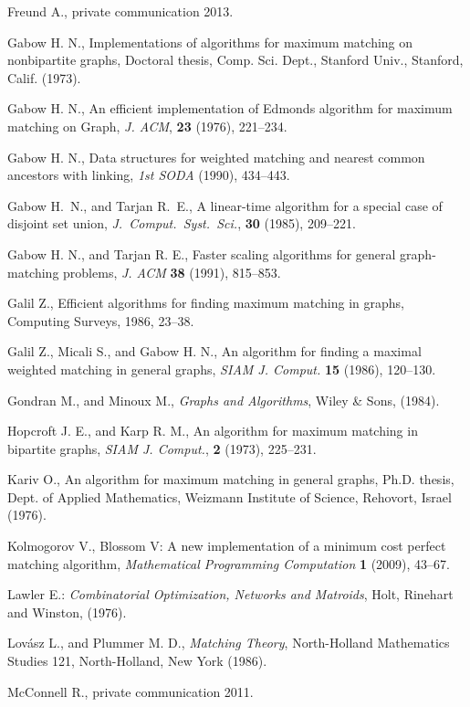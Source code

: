 \documentclass[12pt,twoside,a4paper]{article}
\begin{document}
\begin{thebibliography}{99}
 Freund A., private communication 2013.

 Gabow H. N.,
Implementations of algorithms for maximum matching on nonbipartite graphs,
Doctoral thesis, Comp. Sci. Dept., Stanford Univ., Stanford, Calif.
(1973).

 Gabow H. N.,
An efficient implementation of Edmonds algorithm for maximum matching
on Graph, {\em J. ACM\/}, {\bf 23} (1976), 221--234.

 Gabow H. N.,
Data structures for weighted matching and nearest common ancestors with
linking, {\em 1st SODA\/} (1990), 434--443.

 Gabow H.~N., and Tarjan R.~E., 
A linear-time algorithm for a special case of disjoint set union, 
{\em J.~Comput.~Syst.~Sci.\/}, {\bf 30} (1985), 209--221.


 Gabow H. N., and Tarjan R. E.,
Faster scaling algorithms for general graph-matching problems, {\em J. ACM\/}
{\bf 38} (1991), 815--853.

 Galil Z., Efficient algorithms for finding maximum matching in graphs,
Computing Surveys, 1986, 23--38.

 Galil Z., Micali S., and Gabow H. N., An  algorithm for
finding a maximal weighted matching in general graphs, {\em SIAM J. Comput.\/} {\bf 15}
(1986), 120--130.

 Gondran M., and Minoux M.,
{\em Graphs and Algorithms}, Wiley \& Sons, (1984).

 Hopcroft J. E., and Karp R. M.,
An  algorithm for maximum matching in bipartite graphs,
{\em SIAM J. Comput.\/}, {\bf 2} (1973), 225--231.

 Kariv O.,
An  algorithm for maximum matching in general graphs,
Ph.D. thesis, Dept. of Applied Mathematics, Weizmann Institute of Science,
Rehovort, Israel (1976).

 Kolmogorov V., Blossom V: A new implementation of a minimum cost
perfect matching algorithm, {\em Mathematical Programming Computation\/} {\bf 1} 
(2009), 43--67.

 Lawler E.:
{\em Combinatorial Optimization, Networks and Matroids}, Holt, Rinehart and
Winston, (1976).

 Lov\'{a}sz L., and Plummer M. D.,
{\em Matching Theory\/}, North-Holland Mathematics Studies 121, North-Holland,
New York (1986).

 McConnell R., private communication 2011.


\end{thebibliography}
\end{document}
